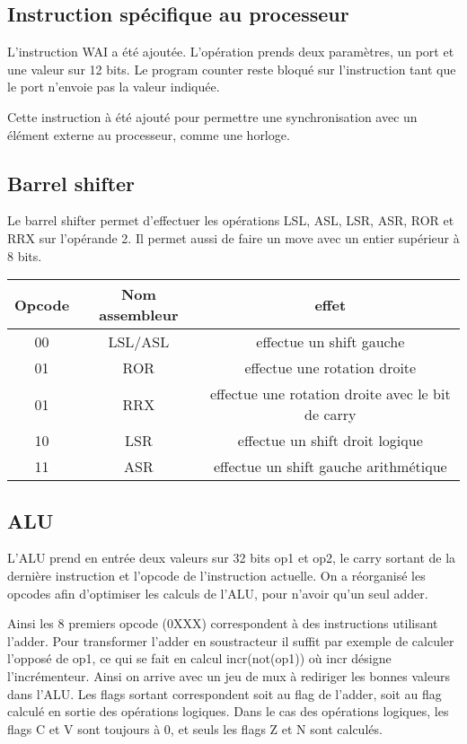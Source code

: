 \documentclass[a4paper]{article}
\begin{document}
\subsection{Instruction spécifique au processeur}

L'instruction WAI a été ajoutée. L'opération prends deux paramètres, un port et
une valeur sur 12 bits. Le program counter reste bloqué sur l'instruction tant
que le port n'envoie pas la valeur indiquée.

Cette instruction à été ajouté pour permettre une synchronisation avec un
élément externe au processeur, comme une horloge.

\subsection{Barrel shifter}

Le barrel shifter permet d'effectuer les opérations LSL, ASL, LSR, ASR, ROR et
RRX sur l'opérande 2. Il permet aussi de faire un move avec un entier supérieur
à 8 bits.

\begin{tabular}{|c|c|c|}
  \hline
  Opcode & Nom assembleur & effet \\
  \hline
  00 & LSL/ASL & effectue un shift gauche\\
  01 & ROR & effectue une rotation droite\\
  01 & RRX & effectue une rotation droite avec le bit de carry\\
  10 & LSR & effectue un shift droit logique\\
  11 & ASR & effectue un shift gauche arithmétique\\
  \hline
\end{tabular}

\subsection{ALU}
L'ALU prend en entrée deux valeurs sur 32 bits op1 et op2, le carry sortant de la dernière instruction et l'opcode de l'instruction actuelle.
On a réorganisé les opcodes afin d'optimiser les calculs de l'ALU, pour n'avoir qu'un seul adder.

Ainsi les 8 premiers opcode (0XXX) correspondent à des instructions utilisant l'adder.
Pour transformer l'adder en soustracteur il suffit par exemple de calculer l'opposé de op1, ce qui se fait en calcul incr(not(op1)) où incr désigne l'incrémenteur.
Ainsi on arrive avec un jeu de mux à rediriger les bonnes valeurs dans l'ALU.
Les flags sortant correspondent soit au flag de l'adder, soit au flag calculé en sortie des opérations logiques. Dans le cas des opérations logiques, les flags C et V
sont toujours à 0, et seuls les flags Z et N sont calculés.
\end{document}
